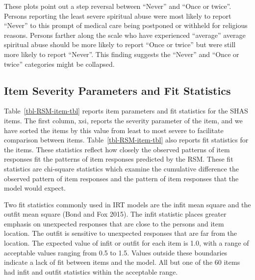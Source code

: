 \documentclass[
  letterpaper,
]{article}
\begin{document}
These plots point out a step reversal between ``Never'' and ``Once or
twice''. Persons reporting the least severe spiritual abuse were most
likely to report ``Never'' to this prompt of medical care being
postponed or withheld for religious reasons. Persons farther along the
scale who have experienced ``average'' average spiritual abuse should be
more likely to report ``Once or twice'' but were still more likely to
report ``Never''. This finding suggests the ``Never'' and ``Once or
twice'' categories might be collapsed.

\hypertarget{item-severity-parameters-and-fit-statistics}{%
\subsection*{Item Severity Parameters and Fit
Statistics}\label{item-severity-parameters-and-fit-statistics}}

Table~\ref{tbl-RSM-item-tbl} reports item parameters and fit statistics
for the SHAS items. The first column, xsi, reports the severity
parameter of the item, and we have sorted the items by this value from
least to most severe to facilitate comparison between items.
Table~\ref{tbl-RSM-item-tbl} also reports fit statistics for the items.
These statistics reflect how closely the observed patterns of item
responses fit the patterns of item responses predicted by the RSM. These
fit statistics are chi-square statistics which examine the cumulative
difference the observed pattern of item responses and the pattern of
item responses that the model would expect.

Two fit statistics commonly used in IRT models are the infit mean square
and the outfit mean square (Bond and Fox 2015). The infit statistic
places greater emphasis on unexpected responses that are close to the
persons and item location. The outfit is sensitive to unexpected
responses that are far from the location. The expected value of infit or
outfit for each item is 1.0, with a range of acceptable values ranging
from 0.5 to 1.5. Values outside these boundaries indicate a lack of fit
between items and the model. All but one of the 60 items had infit and
outfit statistics within the acceptable range.
\end{document}
